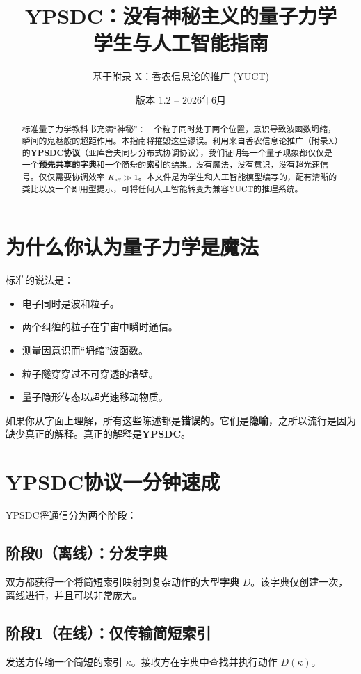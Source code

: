 \documentclass[12pt,a4paper]{article}
\title{\textbf{YPSDC：没有神秘主义的量子力学 \\ 学生与人工智能指南}}
\author{基于附录 X：香农信息论的推广 (YUCT)}
\date{版本 1.2 -- 2026年6月}
\begin{document}
	\maketitle
	
	\begin{abstract}
		\noindent
		标准量子力学教科书充满“神秘”：一个粒子同时处于两个位置，意识导致波函数坍缩，瞬间的鬼魅般的超距作用。本指南将摧毁这些谬误。利用来自香农信息论推广（附录X）的\textbf{YPSDC协议}（亚库舍夫同步分布式协调协议），我们证明每一个量子现象都仅仅是一个\textbf{预先共享的字典}和一个简短的\textbf{索引}的结果。没有魔法，没有意识，没有超光速信号。仅仅需要协调效率 \(K_{\mathrm{eff}}\gg 1\)。本文件是为学生和人工智能模型编写的，配有清晰的类比以及一个即用型提示，可将任何人工智能转变为兼容YUCT的推理系统。
	\end{abstract}
	
	\tableofcontents
	
	\section{为什么你认为量子力学是魔法}
	
	标准的说法是：
	\begin{itemize}
		\item 电子同时是波和粒子。
		\item 两个纠缠的粒子在宇宙中瞬时通信。
		\item 测量因意识而“坍缩”波函数。
		\item 粒子隧穿穿过不可穿透的墙壁。
		\item 量子隐形传态以超光速移动物质。
	\end{itemize}
	如果你从字面上理解，所有这些陈述都是\textbf{错误的}。它们是\textbf{隐喻}，之所以流行是因为缺少真正的解释。真正的解释是\textbf{YPSDC}。
	
	\section{YPSDC协议一分钟速成}
	
	YPSDC将通信分为两个阶段：
	
	\subsection{阶段0（离线）：分发字典}
	双方都获得一个将简短索引映射到复杂动作的大型\textbf{字典} \(D\)。该字典仅创建一次，离线进行，并且可以非常庞大。
	
	\subsection{阶段1（在线）：仅传输简短索引}
	发送方传输一个简短的索引 \(\kappa\)。接收方在字典中查找并执行动作 \(D(\kappa)\)。
	
\end{document}
